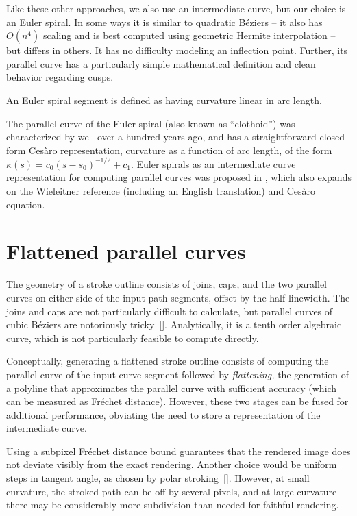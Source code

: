 \documentclass[sigconf, nonacm]{acmart}
\begin{document}
Like these other approaches, we also use an intermediate curve, but our choice is an Euler spiral. In some ways it is similar to quadratic Béziers -- it also has $O(n^4)$ scaling and is best computed using geometric Hermite interpolation -- but differs in others. It has no difficulty modeling an inflection point. Further, its parallel curve has a particularly simple mathematical definition and clean behavior regarding cusps.

An Euler spiral segment is defined as having curvature linear in arc length.

The parallel curve of the Euler spiral (also known as ``clothoid'') was characterized by \citet{Wieleitner1907} well over a hundred years ago, and has a straightforward closed-form Cesàro representation, curvature as a function of arc length, of the form $\kappa(s) = c_0(s - s_0)^{-1/2} + c_1$. Euler spirals as an intermediate curve representation for computing parallel curves was proposed in \citet{Levien2021}, which also expands on the Wieleitner reference (including an English translation) and Cesàro equation.

\section{Flattened parallel curves}

The geometry of a stroke outline consists of joins, caps, and the two parallel curves on either side of the input path segments, offset by the half linewidth. The joins and caps are not particularly difficult to calculate, but parallel curves of cubic Béziers are notoriously tricky~[]. Analytically, it is a tenth order algebraic curve, which is not particularly feasible to compute directly.

Conceptually, generating a flattened stroke outline consists of computing the parallel curve of the input curve segment followed by \emph{flattening,} the generation of a polyline that approximates the parallel curve with sufficient accuracy (which can be measured as Fréchet distance). However, these two stages can be fused for additional performance, obviating the need to store a representation of the intermediate curve.

Using a subpixel Fréchet distance bound guarantees that the rendered image does not deviate visibly from the exact rendering. Another choice would be uniform steps in tangent angle, as chosen by polar stroking~[]. However, at small curvature, the stroked path can be off by several pixels, and at large curvature there may be considerably more subdivision than needed for faithful rendering.
\end{document}
